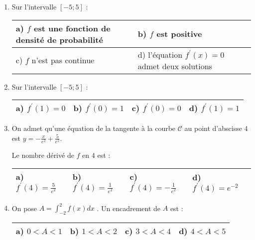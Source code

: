 \begin{center}
\end{center}
\begin{enumerate}
     \item
     Sur l'intervalle $\left[-5 ; 5\right]$ :
     \begin{tabularx}{0.8\linewidth}{|*{3}{>{\centering \arraybackslash }X|}}%
          \hline
          a) $f$ est une fonction de densité de probabilité  &  b) $f$ est positive
          \\ \hline
          c) $f$ n'est pas continue  &  d) l'équation $f^{\prime}\left(x\right)=0$ admet deux solutions
          \\ \hline
     \end{tabularx}
     \item
     Sur l'intervalle $\left[-5 ; 5\right]$ :
     \begin{tabularx}{0.8\linewidth}{|*{3}{>{\centering \arraybackslash }X|}}%
          \hline
          a) $f^{\prime}\left(1\right)=0$  &  b) $f^{\prime}\left(0\right)=1$  &   c) $f^{\prime}\left(0\right)=0$  &  d) $f^{\prime}\left(1\right)=1$
          \\ \hline
     \end{tabularx}
     \item
     On admet qu'une équation de la tangente à la courbe $\mathscr C$ au point d'abscisse 4 est $y=-\frac{x}{e^{2}}+\frac{5}{e^{2}}$.
     \par
     Le nombre dérivé de $f$ en 4 est :
     \begin{tabularx}{0.8\linewidth}{|*{3}{>{\centering \arraybackslash }X|}}%
          \hline
          a) $f^{\prime}\left(4\right)=\frac{5}{e^{2}}$  &  b) $f^{\prime}\left(4\right)=\frac{1}{e^{2}}$  &   c) $f^{\prime}\left(4\right)=-\frac{1}{e^{2}}$  &  d) $f^{\prime}\left(4\right)=e^{-2}$
          \\ \hline
     \end{tabularx}
     \item
     On pose $A=\int_{-2}^{2} f\left(x\right) dx$ . Un encadrement de $A$ est :
     \begin{tabularx}{0.8\linewidth}{|*{3}{>{\centering \arraybackslash }X|}}%
          \hline
          a) $0 < A < 1$  &  b) $1 < A < 2$  & c) $3 < A < 4$  &  d) $4 < A  < 5$
          \\ \hline
\end{tabularx}\end{enumerate}
